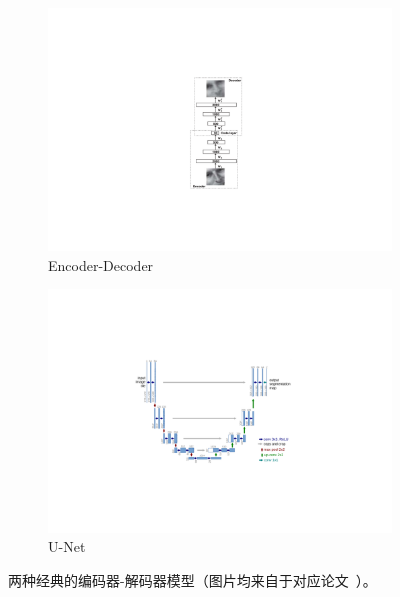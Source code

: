 
\begin{figure}[h!] %
	\centering
	\begin{subfigure}{0.22\textwidth}
		\centering
		\includegraphics[width=1.0\textwidth]{figure/popular_encoder_decoder_original_encoder_encoder}
		\caption{Encoder-Decoder~\cite{hinton2006reducing}}
	\end{subfigure}
	\qquad
	\begin{subfigure}{0.71\textwidth}
		\centering
		\includegraphics[width=1.0\textwidth]{figure/popular_encoder_decoder_unet}
		\caption{U-Net~\cite{ronneberger2015u}}
		\label{subfig:popular_encoder_decoder_unet}
	\end{subfigure}
	\caption[两种经典的编码器-解码器模型]{两种经典的编码器-解码器模型（图片均来自于对应论文~\cite{hinton2006reducing, ronneberger2015u}）。} 
	\label{mulfig:popular_encoder_decoder}
\end{figure}

